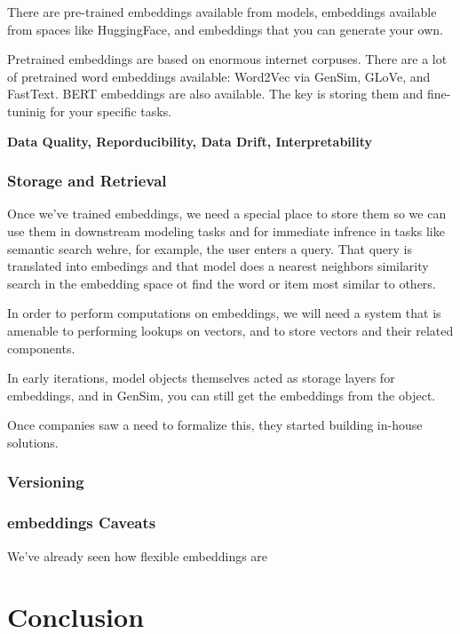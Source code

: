 \documentclass[11pt, table]{diazessay} %
\begin{document}
\begin{sloppypar}
There are pre-trained embeddings available from models, embeddings available from spaces like HuggingFace, and embeddings that you can generate your own. 

Pretrained embeddings are based on enormous internet corpuses.  There are a lot of pretrained word embeddings available: Word2Vec via GenSim, GLoVe, and FastText. BERT embeddings are also available. The key is storing them and fine-tuninig for your specific tasks. 

\textbf{Data Quality, Reporducibility, Data Drift, Interpretability}

\subsubsection{Storage and Retrieval }

Once we've trained embeddings, we need a special place to store them so we can use them in downstream modeling tasks and for immediate infrence in tasks like semantic search wehre, for example, the user enters a query. That query is translated into embedings and that model does a nearest neighbors similarity search in the embedding space ot find the word or item most similar to others. 

In order to perform computations on embeddings, we will need a system that is amenable to performing lookups on vectors, and to store vectors and their related components. 

In early iterations, model objects themselves acted as storage layers for embeddings, and in GenSim, you can still get the embeddings from the object. 

Once companies saw a need to formalize this, they started building in-house solutions. 

\subsubsection{Versioning}


\subsubsection{embeddings Caveats}

We've already seen how flexible embeddings are 




\section{Conclusion}


\end{sloppypar}
\end{document}
